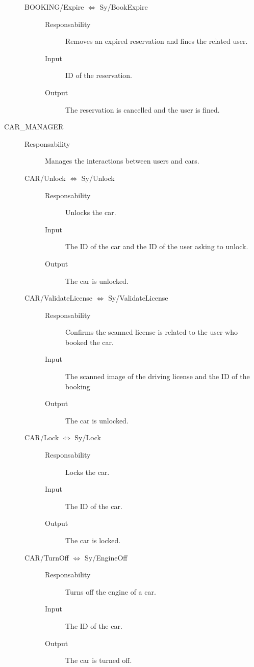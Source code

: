 \documentclass[11pt]{article} %
\begin{document}
\begin{description}
\begin{description}
	\item[BOOKING/Expire $\Leftrightarrow$ Sy/BookExpire] \hfill
		\begin{description}
			\item[Responsability] Removes an expired reservation and fines the related user.
			\item[Input] ID of the reservation.
			\item[Output] The reservation is cancelled and the user is fined.
		\end{description}	
	\end{description}
	
	\item[CAR\_MANAGER] \hfill
	\begin{description}
		\item[Responsability] Manages the interactions between users and cars.

	\item[CAR/Unlock $\Leftrightarrow$ Sy/Unlock] \hfill
		\begin{description}
			\item[Responsability] Unlocks the car.
			\item[Input] The ID of the car and the ID of the user asking to unlock.
			\item[Output] The car is unlocked.
		\end{description}

	\item[CAR/ValidateLicense $\Leftrightarrow$ Sy/ValidateLicense] \hfill
		\begin{description}
			\item[Responsability] Confirms the scanned license is related to the user who booked the car.
			\item[Input] The scanned image of the driving license and the ID of the booking
			\item[Output] The car is unlocked.
		\end{description}

	\item[CAR/Lock $\Leftrightarrow$ Sy/Lock] \hfill
		\begin{description}
			\item[Responsability] Locks the car.
			\item[Input] The ID of the car.
			\item[Output] The car is locked.
		\end{description}

	\item[CAR/TurnOff $\Leftrightarrow$ Sy/EngineOff] \hfill
		\begin{description}
			\item[Responsability] Turns off the engine of a car.
			\item[Input] The ID of the car.
			\item[Output] The car is turned off.
		\end{description}


\end{description}
\end{description}
\end{document}

